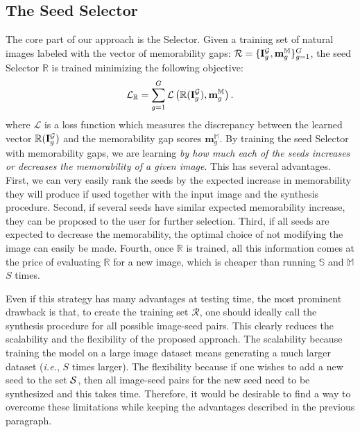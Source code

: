 \documentclass{sig-alternate-05-2015}
\begin{document}
\subsection{The Seed Selector}
\label{sec:seed_select}
The core part of our approach is the Selector.
Given a training set of natural images labeled with the vector of memorability gaps: ${\cal R}=\{\mathbf{I}_g^{\cal G},\mathbf{m}_g^\mathbb{M}\}_{g=1}^{G}$, the seed Selector $\mathbb{R}$ is trained minimizing the following objective:
\begin{equation}{\cal L}_\mathbb{R} = \sum_{g=1}^G  \mathcal{L}\left(\mathbb{R}(\mathbf{I}_g^{\cal G}),\mathbf{m}_g^\mathbb{M}\right).
 \label{loss}
\end{equation}
where $\mathcal{L}$ is a loss function which measures the discrepancy between the learned vector $\mathbb{R}(\mathbf{I}_g^{\cal G})$ and the memorability gap scores $\mathbf{m}_g^\mathbb{M}$.
By training the seed Selector with memorability gaps, we are learning \textit{by how much each of the seeds increases or decreases the memorability of a given image}. This has several advantages. First, we can very easily rank the seeds by the expected increase in memorability they will produce if used together with the input image and the synthesis procedure. Second, if several seeds have similar expected memorability increase, they can be proposed to the user for further selection. Third, if all seeds are expected to decrease the memorability, the optimal choice of not modifying the image can easily be made. Fourth, once $\mathbb{R}$ is trained, all this information comes at the price of evaluating $\mathbb{R}$ for a new image, which is cheaper than running $\mathbb{S}$ and $\mathbb{M}$ $S$ times.

Even if this strategy has many advantages at testing time, the most prominent drawback is that, to create the training set $\mathcal{R}$, one should ideally call the synthesis procedure for all possible image-seed pairs. This clearly reduces the scalability and the flexibility of the proposed approach. The scalability because training the model on a large image dataset means generating a much larger dataset (\textit{i.e.}, $S$ times larger). The flexibility because if one wishes to add a new seed to the set ${\cal S}$, then all image-seed pairs for the new seed need to be synthesized and this takes time. Therefore, it would be desirable to find a way to overcome these limitations while keeping the advantages described in the previous paragraph.
\end{document}
